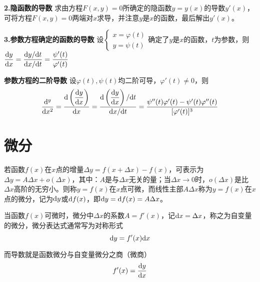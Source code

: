 \textbf{2.隐函数的导数} \quad 求由方程$F(x,y)=0$所确定的隐函数$y=y(x)$的导数$y'(x)$，可将方程$F(x,y)=0$两端对$x$求导，并注意$y$是$x$的函数，最后解出$y'(x)$。

\textbf{3.参数方程确定的函数的导数} \quad 设$\left\{\begin{aligned}x=\varphi(t) \\ y=\psi(t) \end{aligned}\right.$确定了$y$是$x$的函数，$t$为参数，则$\dfrac{\mathrm{d} y}{\mathrm{d} x}=\dfrac{\mathrm{d} y/\mathrm{d} t}{\mathrm{d} x/\mathrm{d} t}=\dfrac{\psi'(t)}{\varphi'(t)}$
\vspace{2mm}

\textbf{参数方程的二阶导数} \quad 设$\varphi(t),\psi(t)$均二阶可导，$\varphi'(t)\neq0$，则
\begin{equation}
    \dfrac{\mathrm{d}^y}{\mathrm{d} x^2}=\dfrac{\mathrm{d}\left(\dfrac{\mathrm{d} y}{\mathrm{d} x}\right)}{\mathrm{d} x}=\dfrac{\mathrm{d}\left(\dfrac{\mathrm{d} y}{\mathrm{d} x}\right)/\mathrm{d} t}{\mathrm{d} x/\mathrm{d} t}=\dfrac{\psi''(t)\varphi'(t)-\psi'(t)\varphi''(t)}{[\varphi'(t)]^3}
    \nonumber
\end{equation}

\section{微分}
\begin{definition}[微分定义] \label{def:the_definition_differential}
    若函数$f(x)$在$x$点的增量$\Delta y=f(x+\Delta x)-f(x)$，可表示为$\Delta y=A\Delta x+o(\Delta x)$，其中：$A$是与$\Delta x$无关的量；当$\Delta x\rightarrow0$时，$o(\Delta x)$是比$\Delta x$高阶的无穷小。则称$y=f(x)$在$x$点可微，而线性主部$A\Delta x$称为$y=f(x)$在$x$点的微分，记为$\mathrm{d} y$或$\mathrm{d} f(x)$，即$\mathrm{d} y=\mathrm{d} f(x)=A\Delta x$。

    当函数$f(x)$可微时，微分中$\Delta x$的系数$A=f'(x)$，记$\mathrm{d} x=\Delta x$，称之为自变量的微分，微分表达式通常写为对称形式
    \begin{equation}
        \mathrm{d} y=f'(x)\mathrm{d} x
        \nonumber
    \end{equation}

    而导数就是函数微分与自变量微分之商（微商）
    \begin{equation}
        f'(x)=\dfrac{\mathrm{d} y}{\mathrm{d} x}
        \nonumber
    \end{equation}
\end{definition}

